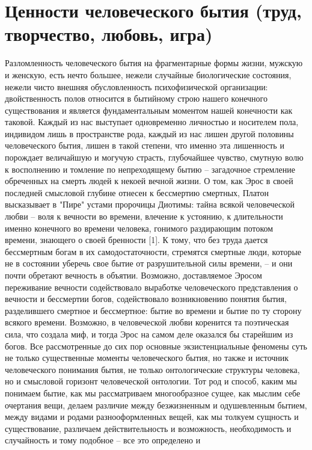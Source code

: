 \documentclass[12pt]{article}
\begin{document}
\section{Ценности человеческого бытия (труд, творчество, любовь, игра)}
Разломленность человеческого бытия на фрагментарные формы жизни, мужскую и женскую,
есть нечто большее, нежели случайные биологические состояния, нежели чисто внешняя
обусловленность  психофизической  организации:  двойственность  полов  относится  в
бытийному строю нашего конечного существования и является фундаментальным моментом
нашей конечности как таковой.
Каждый из нас выступает одновременно личностью и носителем пола, индивидом лишь в пространстве рода,
каждый  из  нас  лишен  другой  половины  человеческого  бытия,  лишен  в  такой  степени,  что  именно  эта
лишенность и порождает величайшую и могучую страсть, глубочайшее чувство, смутную волю к восполнению
и томление по непреходящему бытию -- загадочное стремление обреченных на смерть людей к некоей вечной
жизни.  О  том,  как  Эрос  в  своей  последней  смысловой  глубине  отнесен  к  бессмертию  смертных,  Платон
высказывает в "Пире" устами пророчицы Диотимы: тайна всякой человеческой любви -- воля к вечности во
времени, влечение к устоянию, к длительности именно конечного во времени человека, гонимого раздирающим
потоком времени, знающего о своей бренности [1]. К тому, что без труда дается бессмертным богам в их
самодостаточности, стремятся смертные люди, которые не в состоянии уберечь свое бытие от разрушительной
силы времени, -- и они почти обретают вечность в объятии. Возможно, доставляемое Эросом переживание
вечности содействовало выработке человеческого представления о вечности и бессмертии богов, содействовало
возникновению понятия бытия, разделившего смертное и бессмертное: бытие во времени и бытие по ту сторону
всякого времени. Возможно, в человеческой любви коренится та поэтическая сила, что создала миф, и тогда
Эрос  на  самом  деле  оказался  бы  старейшим  из  богов.  Все  рассмотренные  до  сих  пор  основные
экзистенциальные феномены суть не только существенные моменты человеческого бытия, но также и источник
человеческого  понимания  бытия, не  только онтологические  структуры человека,  но  и  смысловой  горизонт
человеческой онтологии. Тот род и способ, каким мы понимаем бытие, как мы рассматриваем многообразное
сущее, как мыслим себе очертания вещи, делаем различие между безжизненным и одушевленным бытием, 
между видами и родами разнооформленных вещей, как мы толкуем сущность и существование, различаем
действительность  и  возможность,  необходимость  и  случайность  и  тому  подобное  --  все  это  определено  и
\end{document}
